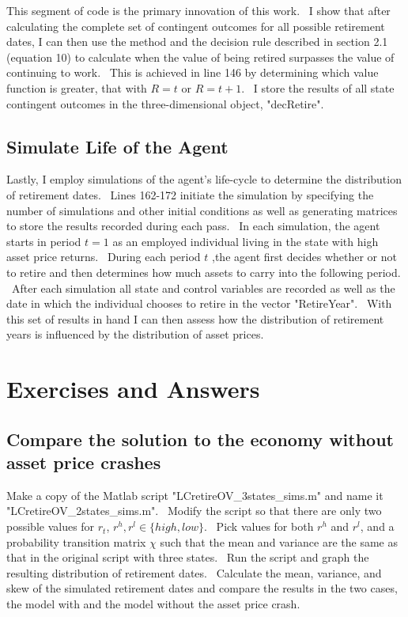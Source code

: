 \documentclass[12pt]{article}
\begin{document}
This segment of code is the primary innovation of this work. \ I show that
after calculating the complete set of contingent outcomes for all possible
retirement dates, I can then use the method and the decision rule described
in section 2.1 (equation 10) to calculate when the value of being retired
surpasses the value of continuing to work. \ This is achieved in line 146 by
determining which value function is greater, that with $R=t$ or $R=t+1$. \ I
store the results of all state contingent outcomes in the three-dimensional
object, "decRetire".

\subsection{Simulate Life of the Agent}

Lastly, I employ simulations of the agent's life-cycle to determine the
distribution of retirement dates. \ Lines 162-172 initiate the simulation by
specifying the number of simulations and other initial conditions as well as
generating matrices to store the results recorded during each pass. \ In
each simulation, the agent starts in period $t=1$ as an employed individual
living in the state with high asset price returns. \ During each period $t$%
,the agent first decides whether or not to retire and then determines how
much assets to carry into the following period. \ After each simulation all
state and control variables are recorded as well as the date in which the
individual chooses to retire in the vector "RetireYear". \ With this set of
results in hand I can then assess how the distribution of retirement years
is influenced by the distribution of asset prices. \ 

\section{Exercises and Answers}

\subsection{Compare the solution to the economy without asset price crashes}

Make a copy of the Matlab script "LCretireOV\_3states\_sims.m" and name it 
"LCretireOV\_2states\_sims.m". \ Modify the script so that there are only
two possible values for $r_{t}$, $r^{h},r^{l}\in \{high,low\}$. \ Pick
values for both $r^{h}$ and $r^{l}$, and a probability transition matrix $%
\chi $ such that the mean and variance are the same as that in the original
script with three states. \ Run the script and graph the resulting
distribution of retirement dates. \ Calculate the mean, variance, and skew
of the simulated retirement dates and compare the results in the two cases,
the model with and the model without the asset price crash. \ 
\end{document}
